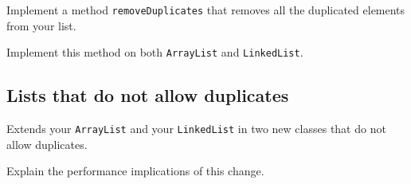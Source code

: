 \documentclass[a4paper, 11pt]{article}
\begin{document}
Implement a method \verb+removeDuplicates+ that removes all the duplicated elements from your list.

Implement this method on both \verb+ArrayList+ and \verb+LinkedList+.


\subsection{Lists that do not allow duplicates}

Extends your \verb+ArrayList+ and your \verb+LinkedList+ in two new classes that do not allow duplicates.

Explain the performance implications of this change.
\end{document}
